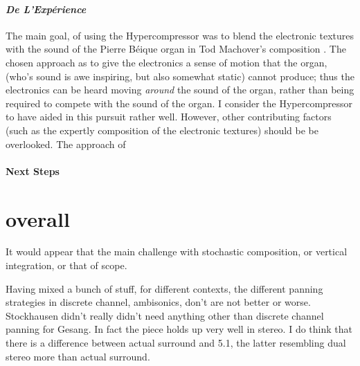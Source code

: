 \paragraph{\textit{De L'Exp\'{e}rience}}
The main goal, of using the Hypercompressor was to blend the
electronic textures with the sound of the Pierre B\'{e}ique organ in
Tod Machover's composition . The chosen approach as to give the
electronics a sense of motion that the organ, (who's sound is awe
inspiring, but also somewhat static) cannot produce; thus the
electronics can be heard moving \emph{around} the sound of the organ,
rather than being required to compete with the sound of the organ. I
consider the Hypercompressor to have aided in this pursuit rather
well. However, other contributing factors (such as the expertly
composition of the electronic textures) should be be overlooked.
The approach of 



\paragraph{Next Steps}

\section{overall}
It would appear that the main challenge with stochastic composition,
or vertical integration, or that of scope. 

Having mixed a bunch of stuff, for different contexts, the different
panning strategies in discrete channel, ambisonics, don't are not
better or worse. Stockhausen didn't really didn't need anything other than
discrete channel panning for Gesang. In fact the piece holds up very
well in stereo. I do think that there is a difference between actual
surround and 5.1, the latter resembling dual stereo more than actual
surround. 


